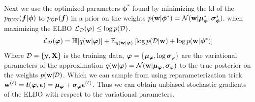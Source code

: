 \documentclass{article}
\begin{document}
Next we use the optimized parameters $\bm \phi^*$ 
found by minimizing the kl of the  $\pbnn (\bm f |\bm \phi )$
to $\pgp (\bm f  ) $  in a prior on the weights  
$p( \mathbf{w} |\bm \phi ^*) =\mathcal{N} (  \mathbf{w}  |  \bm \mu _{\bm \phi} ^*,  \bm \sigma _{\bm \phi}^*) $. 
when maximizing the ELBO $ \mathcal{L} _{\mathcal{D}} (\bm \varphi ) \leq \log p(\mathcal{D}) $. 
\begin{align}
    \mathcal{L} _{\mathcal{D}} (\bm \varphi ) 
    =  \mathbb{H} [ q ( \mathbf{w}  | \bm \varphi)] + 
        \mathbb{E} _{q ( \mathbf{w}  | \bm \varphi)} \left[ { \log p (\mathcal{D} |  \mathbf{w}  )  + \log p ( \mathbf{w}  | \bm {\bm \phi}^* ) } \right] 
\end{align}
Where $ \mathcal{D} =\{ \mathbf{y} ,  \mathbf{X}  \} $ is the training data, $\bm \varphi =\{ \bm \mu_{\tiny\bm \varphi} , \log \bm \sigma _{\tiny \varphi} \} $ are the variational parameters of the approximation  
$q(\B w | \bm \varphi) = \N (\B w |\bm \mu_{\tiny\bm \varphi} , \bm \sigma _{\tiny \varphi} )$ 
to the true posterior on the weights $p( \mathbf{w}  |\mathcal{D} )$. Which we can sample from using reparameterization trick \cite{vae,sbpdgm}
 $ \mathbf{w}  ^{(\ell)} = \bm t (\bm \varphi, \bm \epsilon)= \bm \mu _{\bm \varphi} + \bm \sigma _{\bm \varphi}\bm \epsilon ^{(\ell)} $.
Thus we can obtain unbiased stochastic gradients of the ELBO
with respect to the variational parameters. 
\newpage 
\end{document}
